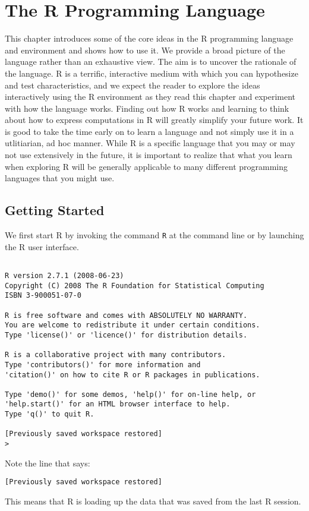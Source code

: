 	
\chapter{The R Programming Language}
\label{chap:RIntro}
This chapter introduces some of the core ideas in the R programming
language and environment and shows how to use it. We provide a broad
picture of the language rather than an exhaustive view.  The aim is to
uncover the rationale of the language. R is a terrific, interactive
medium with which you can hypothesize and test characteristics, and we
expect the reader to explore the ideas interactively using the R
environment as they read this chapter and experiment with how the
language works. Finding out how R works and learning to think about
how to express computations in R will greatly simplify your future
work. It is good to take the time early on to learn a language and not
simply use it in a utlitiarian, ad hoc manner. While R is a specific
language that you may or may not use extensively in the future, it is
important to realize that what you learn when exploring R will be
generally applicable to many different programming languages that you
might use.


\section{Getting Started}
We first start R by invoking the command \verb+R+ at the command line
or by launching the R user interface.  
{\footnotesize{
\begin{verbatim}

R version 2.7.1 (2008-06-23)
Copyright (C) 2008 The R Foundation for Statistical Computing
ISBN 3-900051-07-0

R is free software and comes with ABSOLUTELY NO WARRANTY.
You are welcome to redistribute it under certain conditions.
Type 'license()' or 'licence()' for distribution details.

R is a collaborative project with many contributors.
Type 'contributors()' for more information and
'citation()' on how to cite R or R packages in publications.

Type 'demo()' for some demos, 'help()' for on-line help, or
'help.start()' for an HTML browser interface to help.
Type 'q()' to quit R.

[Previously saved workspace restored]
> 
\end{verbatim}
}}
Note the line that says:
\begin{verbatim}
[Previously saved workspace restored]
\end{verbatim}
This means that R is loading up the data that was saved from the
last R session.

